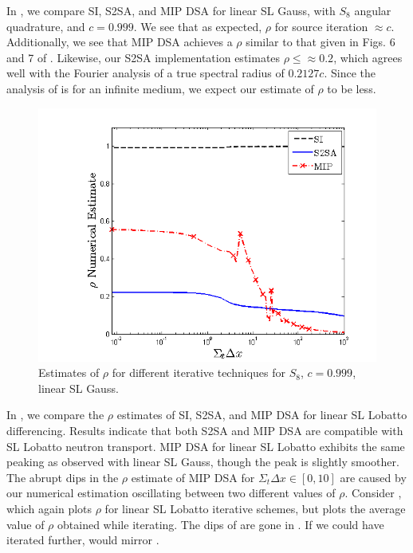 In , we compare SI, S2SA, and MIP DSA for linear SL Gauss, with $S_8$ angular quadrature, and $c=0.999$.
We see that as expected\cite{larsen_dsa}, $\rho$ for source iteration $\approx c$.  
Additionally, we see that MIP DSA achieves a $\rho$ similar to that given in Figs. 6 and 7 of \cite{mip_dsa}.
Likewise, our S2SA implementation estimates $\rho \leq \approx 0.2$, which agrees well with the Fourier analysis of \cite{s2sa} a true spectral radius of $0.2127c$.  Since the analysis of \cite{s2sa} is for an infinite medium, we expect our estimate of $\rho$ to be less.
\begin{figure}[!hbp]
\centering
\includegraphics[width=12cm]{chapter4_acceleration/Const_2_Constant_XS_SN8_P1_Gauss_Solvers.png}
\caption{Estimates of $\rho$ for different iterative techniques for $S_8$, $c=0.999$, linear SL Gauss.}
\label{fig:p1_gauss}
\end{figure}
\vfill{}
\pagebreak
\noindent In , we compare the $\rho$ estimates of SI, S2SA, and MIP DSA for linear SL Lobatto differencing.  Results indicate that both S2SA and MIP DSA are compatible with SL Lobatto neutron transport.
MIP DSA for linear SL Lobatto exhibits the same peaking as observed with linear SL Gauss, though the peak is slightly smoother. 
The abrupt dips in the $\rho$ estimate of MIP DSA for $\Sigma_t \Delta x \in[0,10]$ are caused by our numerical estimation oscillating between two different values of $\rho$.
Consider , which again plots $\rho$ for linear SL Lobatto iterative schemes, but plots the average value of $\rho$ obtained while iterating.
The dips of  are gone in .
If we could have iterated further,  would mirror .
